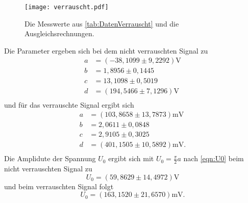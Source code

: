 \begin{figure}[H]
  \centering
  \texttt{[image: verrauscht.pdf]}
  \caption{Die Messwerte aus \autoref{tab:DatenVerrauscht} und die Ausgleichsrechnungen.}
  \label{fig:verrauscht}
\end{figure}
Die Parameter ergeben sich bei dem nicht verrauschten Signal zu
\begin{align*}
  a &= (-38,1099\pm 9,2292)\unit{\volt}\\
  b &= 1,8956\pm 0,1445\\
  c &= 13,1098\pm 0,5019\\
  d &= (194,5466\pm 7,1296)\unit{\volt}\\
\end{align*}
und für das verrauschte Signal ergibt sich
\begin{align*}
  a &= (103,8658\pm 13,7873)\unit{\milli\volt}\\
  b &= 2,0611\pm 0,0848\\
  c &= 2,9105\pm 0,3025\\
  d &= (401,1505\pm 10,5892)\unit{\milli\volt}.\\
\end{align*}
Die Amplidute der Spannung $U_0$ ergibt sich mit $U_0 = \frac{\pi}{2}a$ nach \autoref{eqn:U0} beim nicht verrauschten Signal zu
\begin{equation*}
  U_0 = (59,8629\pm14,4972)\unit{\volt}
\end{equation*}
und beim verrauschten Signal folgt
\begin{equation*}
  U_0 = (163,1520\pm21,6570)\unit{\milli\volt}.
\end{equation*}
